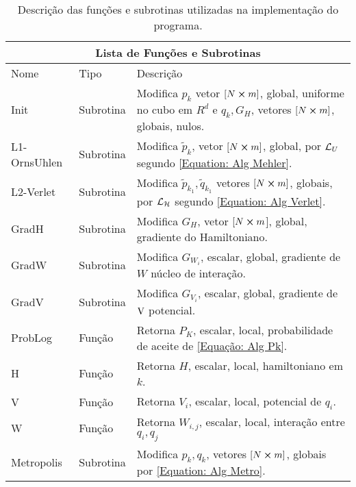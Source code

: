 \begin{table}[ht]
	\centering
	\begin{tabular}{ |p{2.6cm}||p{2cm}|p{10cm}|  }
			\hline
			\multicolumn{3}{|c|}{Lista de Funções e Subrotinas} \\
			\hline
						\hline
			Nome & Tipo & Descrição \\ 
			\hline
						\hline
			Init   		  &Subrotina	 & 
			Modifica ${p}_{k}$ vetor $[N\cross m]$, global, uniforme no cubo em $R^d$ e ${q}_{k}, G_H$, vetores $[N\cross m]$, globais, nulos. \\
			\hline
			L1-OrnsUhlen  &Subrotina	 & 
			Modifica $\tilde{p}_k$, vetor $[N\cross m]$, global, por $\operatorname{\mathcal{L}}_U$ segundo \ref{Equation: Alg Mehler}. \\
						\hline
			L2-Verlet  	  &Subrotina	 & 
			Modifica $\tilde{p}_{k_1},\tilde{q}_{k_1}$ vetores $[N\cross m]$, globais, por $\operatorname{\mathcal{L}}_{\operatorname{\mathcal{H}}}$ segundo \ref{Equation: Alg Verlet}.	\\
						\hline
			GradH         &Subrotina	 & 
			Modifica $G_H$, vetor $[N\cross m$], global, gradiente do Hamiltoniano.					\\
						\hline
			GradW         &Subrotina	 &
			Modifica $G_{W_i}$, escalar, global, gradiente de $W$ núcleo de interação.	\\
						\hline
			GradV  	      &Subrotina	 &
			Modifica $G_{V_i}$, escalar, global, gradiente de $\operatorname{V}$ potencial.		                    \\
						\hline
			ProbLog       &Função		 &
			Retorna $P_K$, escalar, local, probabilidade de aceite de \ref{Equação: Alg Pk}. \\
						\hline
			H             &Função  	 &
			Retorna $H$, escalar, local, hamiltoniano em $k$.	 							\\
						\hline
			V  	      	&Função		 &
			Retorna $V_i$, escalar, local, potencial de $q_i$.								\\
						\hline
			W         	  &Função		 & 
			Retorna $W_{i,j}$, escalar, local, interação entre $q_i,q_j$ 							\\
						\hline
			Metropolis    &Subrotina 	 & 
			Modifica ${p}_{k},{q}_{k}$, vetores $[N\cross m]$, globais por \ref{Equation: Alg Metro}.								\\
			\hline
	\end{tabular}
\caption{ Descrição das funções e subrotinas utilizadas na implementação do programa.}
\label{Table: Funcoes e Subrotinas}
\end{table}

